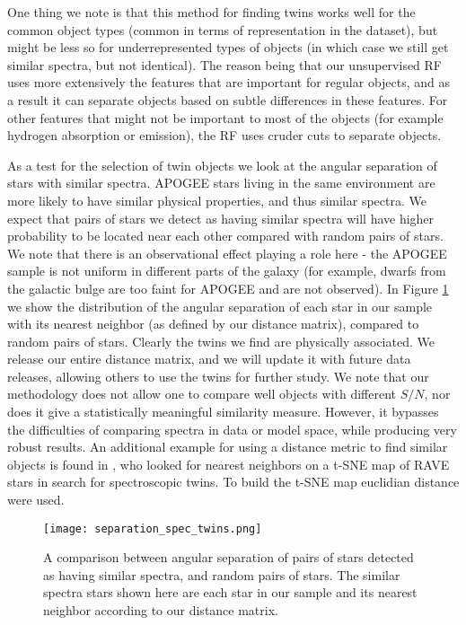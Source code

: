 \documentclass[fleqn,usenatbib]{mnras}
\begin{document}
One thing we note is that this method for finding twins works well for the common object types (common in terms of representation in the dataset), but might be less so for underrepresented types of objects (in which case we still get similar spectra, but not identical). The reason being that our unsupervised RF uses more extensively the features that are important for regular objects, and as a result it can separate objects based on subtle differences in these features. For other features that might not be important to most of the objects (for example hydrogen absorption or emission), the RF uses cruder cuts to separate objects. 

As a test for the selection of twin objects we look at the angular separation of stars with similar spectra. APOGEE stars living in the same environment are more likely to have similar physical properties, and thus similar spectra. We expect that pairs of stars we detect as having similar spectra will have higher probability to be located near each other compared with random pairs of stars. We note that there is an observational effect playing a role here - the APOGEE sample is not uniform in different parts of the galaxy (for example,  dwarfs from the galactic bulge are too faint for APOGEE and are not observed). In Figure \ref{fig:twins_sep} we show the distribution of the angular separation of each star in our sample with its nearest neighbor (as defined by our distance matrix), compared to random pairs of stars. Clearly the twins we find are physically associated. We release our entire distance matrix, and we will update it with future data releases, allowing others to use the twins for further study. We note that our methodology does not allow one to compare well objects with different $S/N$, nor does it give a statistically meaningful similarity measure. However, it bypasses the difficulties of comparing spectra in data or model space, while producing very robust results.  An additional example for using a distance metric to find similar objects is found in \citet{jofre17}, who looked for nearest neighbors on a t-SNE map of RAVE stars in search for spectroscopic twins. To build the t-SNE map euclidian distance were used.


\begin{figure}
\begin{center}
  \texttt{[image: separation\_spec\_twins.png]}
  \caption{A comparison between angular separation of pairs of stars detected as having similar spectra, and random pairs of stars. The similar spectra stars shown here are each star in our sample and its nearest neighbor according to our distance matrix.}
  \label{fig:twins_sep}
  \end{center}
\end{figure}
\end{document}
